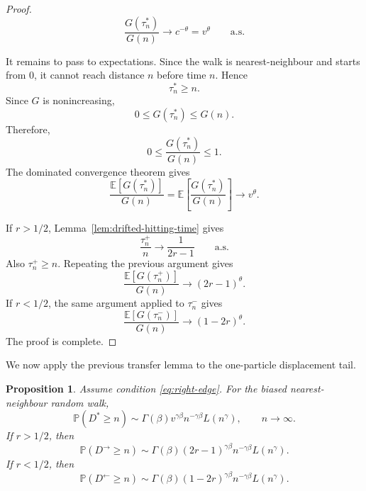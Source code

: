 \documentclass[reqno,final,11pt]{amsart}
\newcommand{\E}{\mathbb E}
\newcommand{\Pbb}{\mathbb P}
\theoremstyle{plain}
\newtheorem{proposition}[theorem]{Proposition}
\theoremstyle{definition}
\theoremstyle{remark}
\numberwithin{equation}{section}
\begin{document}
\begin{proof}
\[
  \frac{G(\tau_n^*)}{G(n)}
  \longrightarrow
  c^{-\theta}
  =
  v^\theta
  \qquad\text{a.s.}
\]

It remains to pass to expectations. Since the walk is nearest-neighbour and
starts from \(0\), it cannot reach distance \(n\) before time \(n\). Hence
\[
  \tau_n^*\ge n.
\]
Since \(G\) is nonincreasing,
\[
  0\le
  G(\tau_n^*)\le G(n).
\]
Therefore,
\[
  0\le
  \frac{G(\tau_n^*)}{G(n)}
  \le 1.
\]
The dominated convergence theorem gives
\[
  \frac{\E[G(\tau_n^*)]}{G(n)}
  =
  \E\left[\frac{G(\tau_n^*)}{G(n)}\right]
  \longrightarrow
  v^\theta.
\]

If \(r>1/2\), Lemma~\ref{lem:drifted-hitting-time} gives
\[
  \frac{\tau_n^+}{n}
  \longrightarrow
  \frac1{2r-1}
  \qquad\text{a.s.}
\]
Also \(\tau_n^+\ge n\). Repeating the previous argument gives
\[
  \frac{\E[G(\tau_n^+)]}{G(n)}
  \longrightarrow
  (2r-1)^\theta.
\]
If \(r<1/2\), the same argument applied to \(\tau_n^-\) gives
\[
  \frac{\E[G(\tau_n^-)]}{G(n)}
  \longrightarrow
  (1-2r)^\theta.
\]
The proof is complete.
\end{proof}

We now apply the previous transfer lemma to the one-particle displacement
tail.


\begin{proposition}\label{prop:Dstar-drift}
Assume condition \eqref{eq:right-edge}. For the biased nearest-neighbour random walk,
\[
  \Pbb(D^*\ge n)
  \sim
  \Gamma(\beta)v^{\gamma\beta}
  n^{-\gamma\beta}L(n^\gamma),
  \qquad n\to\infty.
\]
If \(r>1/2\), then
\[
  \Pbb(D^\to\ge n)
  \sim
  \Gamma(\beta)(2r-1)^{\gamma\beta}
  n^{-\gamma\beta}L(n^\gamma).
\]
If \(r<1/2\), then
\[
  \Pbb(D^\leftarrow\ge n)
  \sim
  \Gamma(\beta)(1-2r)^{\gamma\beta}
  n^{-\gamma\beta}L(n^\gamma).
\]
\end{proposition}
\end{document}
